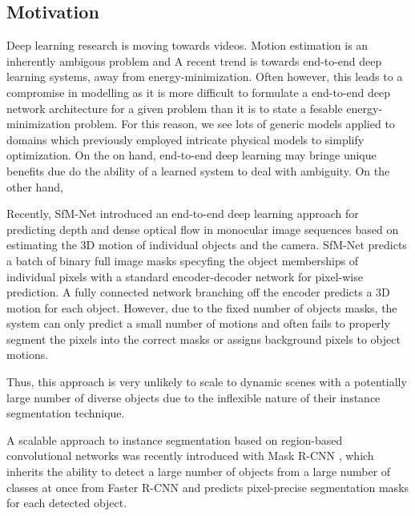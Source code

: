 \subsection{Motivation}



Deep learning research is moving towards videos.
Motion estimation is an inherently ambigous problem and
A recent trend is towards end-to-end deep learning systems, away from energy-minimization.
Often however, this leads to a compromise in modelling as it is more difficult to
formulate a end-to-end deep network architecture for a given problem than it is
to state a fesable energy-minimization problem.
For this reason, we see lots of generic models applied to domains which previously
employed intricate physical models to simplify optimization.
On the on hand, end-to-end deep learning may bringe unique benefits due do the ability
of a learned system to deal with ambiguity.
On the other hand,

Recently, SfM-Net \cite{SfmNet} introduced an end-to-end deep learning approach for predicting depth
and dense optical flow in monocular image sequences based on estimating the 3D motion of individual objects and the camera.
SfM-Net predicts a batch of binary full image masks specyfing the object memberships of individual pixels with a standard encoder-decoder
network for pixel-wise prediction. A fully connected network branching off the encoder predicts a 3D motion for each object.
However, due to the fixed number of objects masks, the system can only predict a small number of motions and
often fails to properly segment the pixels into the correct masks or assigns background pixels to object motions.

Thus, this approach is very unlikely to scale to dynamic scenes with a potentially
large number of diverse objects due to the inflexible nature of their instance segmentation technique.

A scalable approach to instance segmentation based on region-based convolutional networks
was recently introduced with Mask R-CNN \cite{MaskRCNN}, which inherits the ability to detect
a large number of objects from a large number of classes at once from Faster R-CNN
and predicts pixel-precise segmentation masks for each detected object.

